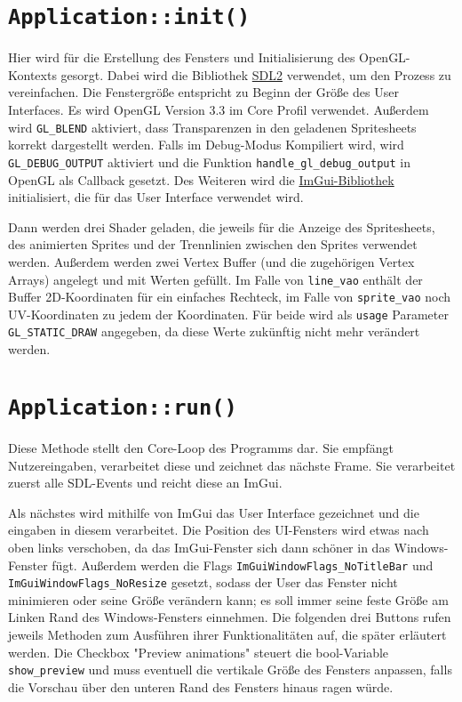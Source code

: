 \section{\lstinline{Application::init()}}
Hier wird für die Erstellung des Fensters und Initialisierung des OpenGL-Kontexts gesorgt. Dabei wird die Bibliothek \href{https://www.libsdl.org/}{SDL2} verwendet, um den Prozess zu vereinfachen. Die Fenstergröße entspricht zu Beginn der Größe des User Interfaces. Es wird OpenGL Version 3.3 im Core Profil verwendet. Außerdem wird \lstinline{GL_BLEND} aktiviert, dass Trans­pa­renzen in den geladenen Spritesheets korrekt dargestellt werden. Falls im Debug-Modus Kompiliert wird, wird \lstinline{GL_DEBUG_OUTPUT} aktiviert und die Funktion \lstinline{handle_gl_debug_output} in OpenGL als Callback gesetzt. Des Weiteren wird die \href{https://github.com/ocornut/imgui}{ImGui-Bibliothek} initialisiert, die für das User Interface verwendet wird. 

Dann werden drei Shader geladen, die jeweils für die Anzeige des Spritesheets, des animierten Sprites und der Trennlinien zwischen den Sprites verwendet werden. Außerdem werden zwei Vertex Buffer (und die zugehörigen Vertex Arrays) angelegt und mit Werten gefüllt. Im Falle von \lstinline{line_vao} enthält der Buffer 2D-Koordinaten für ein einfaches Rechteck, im Falle von \lstinline{sprite_vao} noch UV-Koordinaten zu jedem der Koordinaten. Für beide wird als \lstinline{usage} Parameter \lstinline{GL_STATIC_DRAW} angegeben, da diese Werte zukünftig nicht mehr verändert werden. 

\section{\lstinline{Application::run()}}
Diese Methode stellt den Core-Loop des Programms dar. Sie empfängt Nutzereingaben, verarbeitet diese und zeichnet das nächste Frame. Sie verarbeitet zuerst alle SDL-Events und reicht diese an ImGui.

Als nächstes wird mithilfe von ImGui das User Interface gezeichnet und die eingaben in diesem verarbeitet. Die Position des UI-Fensters wird etwas nach oben links verschoben, da das ImGui-Fenster sich dann schöner in das Windows-Fenster fügt. Außerdem werden die Flags \lstinline{ImGuiWindowFlags_NoTitleBar} und \lstinline{ImGuiWindowFlags_NoResize} gesetzt, sodass der User das Fenster nicht minimieren oder seine Größe verändern kann; es soll immer seine feste Größe am Linken Rand des Windows-Fensters einnehmen. Die folgenden drei Buttons rufen jeweils Methoden zum Ausführen ihrer Funktionalitäten auf, die später erläutert werden. Die Checkbox "Preview animations" steuert die bool-Variable \lstinline{show_preview} und muss eventuell die vertikale Größe des Fensters anpassen, falls die Vorschau über den unteren Rand des Fensters hinaus ragen würde.

